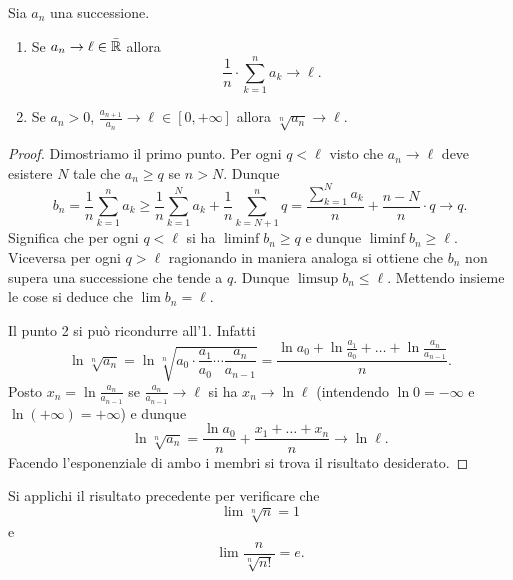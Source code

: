 \begin{theorem}
  \label{th:criterio_cesaro}%
  \mymark{*}%
%
  Sia $a_n$ una successione.
  \begin{enumerate}
  \item
    Se
    $   a_n \to \ell \in \bar {{\mathbb R}}$
    allora
    \[
    \frac 1 n \cdot \displaystyle\sum_{k=1}^n a_k \to \ell.
    \]
  
  \item
    Se $a_n>0$,
    $\displaystyle\frac{a_{n+1}}{a_n} \to \ell \in [0,+\infty]$
    allora
    $\displaystyle \sqrt[n]{a_n}\to \ell$.
  \end{enumerate}
  \end{theorem}
  \begin{proof}
  Dimostriamo il primo punto.
  Per ogni $q<\ell$ visto che $a_n\to \ell$ deve esistere $N$ tale che 
  $a_n\ge q$ se $n> N$. 
  Dunque 
  \[
    b_n = \frac 1 n \sum_{k=1}^{n} a_k 
    \ge \frac 1 n \sum_{k=1}^N a_k + \frac 1 n \sum_{k=N+1}^n q 
    = \frac{\sum_{k=1}^N a_k}{n} + \frac{n-N}{n}\cdot q \to q.
  \]
  Significa che per ogni $q<\ell$ si ha $\liminf b_n \ge q$ e 
  dunque $\liminf b_n \ge \ell$.
  Viceversa per ogni $q>\ell$ ragionando in maniera analoga si ottiene 
  che $b_n$ non supera una successione che tende a $q$.
  Dunque $\limsup b_n\le \ell$. 
  Mettendo insieme le cose si deduce che $\lim b_n = \ell$.
    
  Il punto 2 si può ricondurre all'1.
  Infatti
  \[
    \ln \sqrt[n]{a_n}
    = \ln \sqrt[n]{a_0\cdot \frac{a_1}{a_0} \cdots \frac{a_n}{a_{n-1}}}
    = \frac{\ln a_0 + \ln \frac{a_1}{a_0} + \dots + \ln \frac{a_n}{a_{n-1}}}{n}.
  \]
  Posto $x_n = \ln \frac{a_n}{a_{n-1}}$
  se $\frac{a_n}{a_{n-1}}\to \ell$
  si ha $x_n\to \ln \ell$ (intendendo $\ln 0 = -\infty$ e $\ln (+\infty)=+\infty$) e dunque
  \[
    \ln \sqrt[n]{a_n} = \frac{\ln a_0}{n} + \frac{x_1 + \dots + x_n}{n}
    \to \ln \ell.
  \]
  Facendo l'esponenziale di ambo i membri si trova il risultato desiderato.
  \end{proof}
  
  \begin{exercise}\label{ex:7340098}
  Si applichi il risultato precedente per
  verificare che
  \[
     \lim \sqrt[n]{n} = 1
  \]
 e
 \[
   \lim \frac{n}{\sqrt[n]{n!}} = e.
 \]
 \end{exercise}

